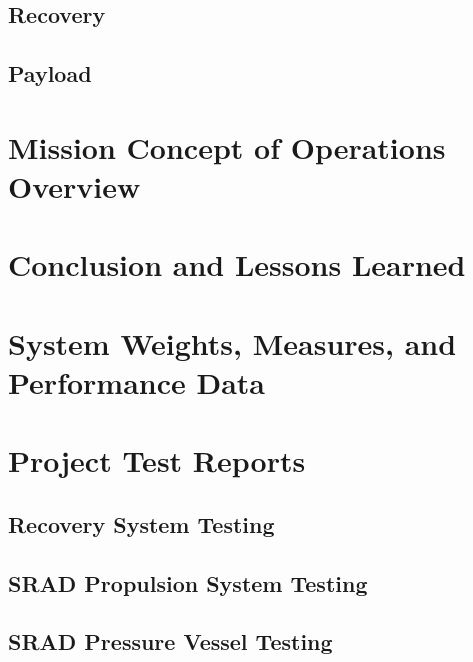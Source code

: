 \documentclass[report, wip]{sac}
\begin{document}
	\subsection{Recovery} \label{recovery}

	\subsection{Payload} \label{payload}
 
	\section{Mission Concept of Operations Overview} \label{conops}
 
	\helptext{\CONOPSDescription}

	\section{Conclusion and Lessons Learned}
	\helptext{\ConclusionDescription}

	\appendix
    \renewcommand{\thesubsection}{\thesection.\arabic{subsection}}
    \renewcommand{\thesubsubsection}{\thesubsection.\arabic{subsubsection}}

	\if@wip
        
	\fi

	\section{System Weights, Measures, and Performance Data}\label{measures}
	\helptext{\SystemMeasuresDescription}

	\pagebreak
	\section{Project Test Reports}\label{test-reports}
	\helptext{\TestReportsDescription}

	\subsection{Recovery System Testing}\label{recovery-test}
    \pageleftblank

	\subsection{SRAD Propulsion System Testing}\label{propulsion-test}
	\pageleftblank

	\subsection{SRAD Pressure Vessel Testing}\label{pressure-test}
	\pageleftblank
\end{document}
